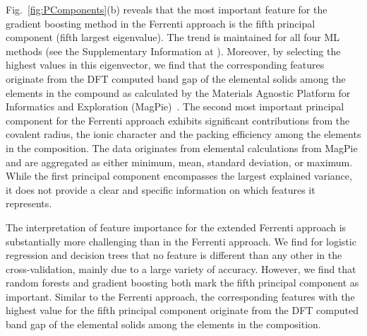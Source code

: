\documentclass[superscriptaddress,unsortedaddress,
 amsmath,amssymb,
 aps,
]{revtex4-2}
\begin{document}
Fig.~\ref{fig:PComponents}(b) reveals that the most important feature for the gradient boosting method in the Ferrenti approach is the fifth principal component (fifth largest eigenvalue). The trend is maintained for all four ML methods (see the Supplementary Information at \cite{supplementary}). Moreover, by selecting the highest values in this eigenvector, we find that the corresponding features originate from the DFT computed band gap of the elemental solids among the elements in the compound as calculated by the Materials Agnostic Platform for Informatics and Exploration (MagPie)~\cite{magpie}. 
The second most important principal component for the Ferrenti approach exhibits significant contributions from the covalent radius, the ionic character and the packing efficiency among the elements in the composition. 
The data originates from elemental calculations from MagPie and are aggregated as either minimum, mean, standard deviation, or maximum. 
While the first principal component encompasses the largest explained variance, it does not provide a clear and specific information on which features it represents. 

The interpretation of feature importance for the extended Ferrenti approach is substantially more challenging than in the Ferrenti approach. We find for logistic regression and decision trees that no feature is different than any other in the cross-validation, mainly due to a large variety of accuracy. However, we find that random forests and gradient boosting both mark the fifth principal component as important. Similar to the Ferrenti approach, the corresponding features with the highest value for the fifth principal component originate from the DFT computed band gap of the elemental solids among the elements in the composition. 
\end{document}
